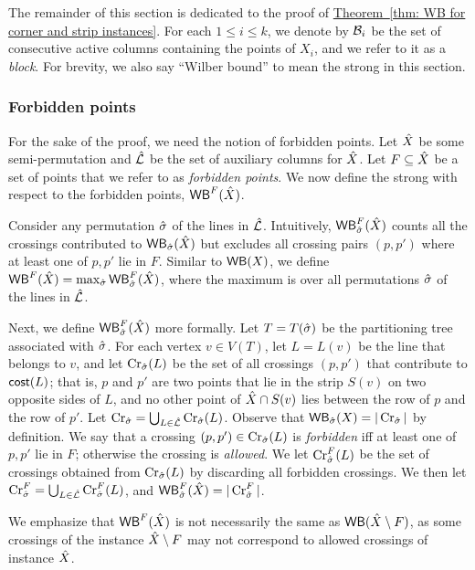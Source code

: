 \documentclass[11pt]{article}
\numberwithin{equation}{section}
\theoremstyle{definition}
\theoremstyle{plain}
\newcommand{\expref}[2]{\hyperref[#2]{#1~\ref{#2}}}
\begin{document}
The remainder of this section is dedicated to the proof of \expref{Theorem}{thm: WB for corner and strip instances}.
%
For each $1\leq i\leq k$, we denote by ${\mathcal{B}}_i$ be the set of consecutive active columns containing the points of $X_i$, and we refer to it as a \emph{block}. For brevity, we also say ``Wilber bound'' to mean the strong \WBone in this section.

%
%
%
%
\subsubsection{Forbidden points}
%
%
%
%
For the sake of the proof, we need the notion of forbidden points.
Let $\hat X$ be some semi-permutation and $\hat{\mathcal{L}}$ be the set of auxiliary columns for $\hat X$.
Let $F\subseteq \hat X$ be a set of points that we refer to as \emph{forbidden points}.
We now define the strong \WBone with respect to the forbidden points, $\mathsf{WB}^F(\hat X)$.

Consider any permutation $\hat{\sigma}$ of the lines in $\hat{\mathcal{L}}$. 
Intuitively, $\mathsf{WB}_{\hat{\sigma}}^F(\hat X)$ counts all the crossings contributed to $\mathsf{WB}_{\hat{\sigma}}(\hat X)$ but excludes all crossing pairs $(p,p')$ where at least one of $p,p'$ lie in $F$.
Similar to $\mathsf{WB}(X)$, we define $\mathsf{WB}^F(\hat X) = \max_{\hat{\sigma}} \mathsf{WB}_{\hat{\sigma}}^F(\hat X)$, where the maximum is over all permutations $\hat{\sigma}$ of the lines in $\hat{\mathcal{L}}$.

Next, we define $\mathsf{WB}_{\hat{\sigma}}^F(\hat X)$ more formally. 
Let $T=T(\hat{\sigma})$ be the partitioning tree associated with $\hat{\sigma}$.
For each vertex $v \in V(T)$, let $L = L(v)$ be the line that belongs to $v$, and 
let $\operatorname{Cr}_{\hat{\sigma}}(L)$ be the set of all crossings $(p,p')$ that contribute to $\mathsf{cost}(L)$; 
that is, $p$ and $p'$ are two points that lie in the strip $S(v)$ on two opposite sides of $L$, and no other point of $\hat X\cap S(v)$ lies between the row of $p$ and the row of $p'$.
Let $\operatorname{Cr}_{\hat{\sigma}} = \bigcup_{L\in \hat{\mathcal{L}}}\operatorname{Cr}_{\hat{\sigma}}(L)$.
Observe that $\mathsf{WB}_{\hat{\sigma}}(X) = |\operatorname{Cr}_{\hat{\sigma}}|$ by definition.
We say that a crossing $(p,p')\in \operatorname{Cr}_{\hat{\sigma}}(L)$ is \emph{forbidden} iff at least one of $p,p'$ lie in $F$; otherwise the crossing is \emph{allowed}. We let $\operatorname{Cr}^F_{\hat{\sigma}}(L)$ be the set of crossings obtained from $\operatorname{Cr}_{\hat{\sigma}}(L)$ by discarding all forbidden crossings. We then let $\operatorname{Cr}^F_{\hat{\sigma}}=\bigcup_{L\in \hat{\mathcal{L}}}\operatorname{Cr}^F_{\hat{\sigma}}(L)$, and $\mathsf{WB}^F_{\hat{\sigma}}(\hat X)=|\operatorname{Cr}^F_{\hat{\sigma}}|$.
%
%
%
%

We emphasize that $\mathsf{WB}^F(\hat X)$ is not necessarily the same as $\mathsf{WB}(\hat X\setminus F)$, as some crossings of the instance $\hat X\setminus F$ may not correspond to allowed crossings of instance $\hat X$.
\end{document}
